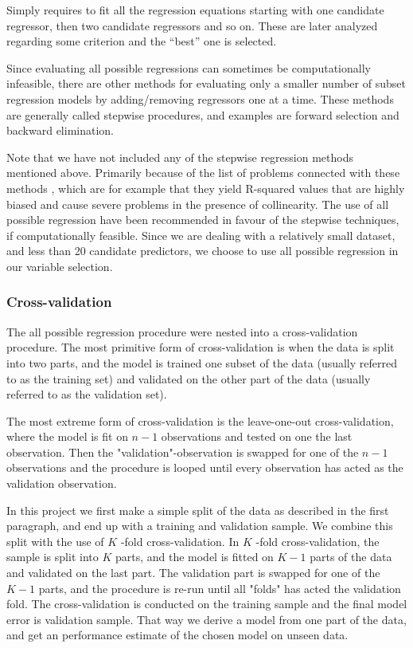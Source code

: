 \documentclass[11pt]{article}
\begin{document}
Simply requires to fit all the regression equations starting with one candidate regressor, then two
candidate regressors and so on. These are later analyzed regarding some criterion and the “best” one is selected. 

Since evaluating all possible regressions can sometimes be computationally infeasible, there are other
methods for evaluating only a smaller number of subset regression models by adding/removing regressors one
at a time. These methods are generally called stepwise procedures, and examples are forward selection and backward
elimination. 

Note that we have not included any of the stepwise regression methods mentioned above. Primarily
because of the list of problems connected with these methods \cite{20856}, which are for example that they yield
R-squared values that are highly biased and cause severe problems in the presence of collinearity. 
The use of all possible regression have been recommended in favour of the stepwise techniques, if 
computationally feasible. \cite{Montgomery2012} Since we are dealing with a relatively small dataset, 
and less than 20 candidate predictors, we choose to use all possible regression in our variable selection.

\subsubsection{Cross-validation}
\label{sec:org68a33d2}
The all possible regression procedure were nested into a cross-validation procedure. The most 
primitive form of cross-validation is when the data is split into two parts, and the model
is trained one subset of the data (usually referred to as the training set) and validated 
on the other part of the data (usually referred to as the validation set).

The most extreme form of cross-validation is the leave-one-out cross-validation, where the model 
is fit on \(n - 1\) observations and tested on one the last observation. Then the "validation"-observation 
is swapped for one of the \(n - 1\) observations and the procedure is looped until every observation has acted 
as the validation observation.

In this project we first make a simple split of the data as described in the first paragraph, and 
end up with a training and validation sample. We combine this split with the use of
\(K\) -fold cross-validation. In \(K\) -fold cross-validation, the sample is split into \(K\) parts, and the
model is fitted on \(K - 1\) parts of the data and validated on the last part. The validation part is swapped for one of
the \(K - 1\) parts, and the procedure is re-run until all "folds" has acted the validation fold. The cross-validation 
is conducted on the training sample and the final model error is validation sample. That way we derive a model
from one part of the data, and get an performance estimate of the chosen model on unseen data.
\end{document}
